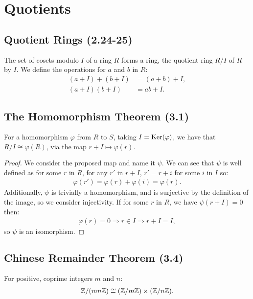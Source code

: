 \section{Quotients}

\subsection{Quotient Rings (2.24-25)} \label{2.24} \label{2.25}

The set of cosets modulo $I$ of a ring $R$ forms a ring, the quotient ring $R / I$ of 
$R$ by $I$. We define the operations for $a$ and $b$ in $R$: \begin{align*}
    (a + I) + (b + I) &= (a + b) + I, \\
    (a + I)(b + I) &= ab + I.
\end{align*}

\subsection{The Homomorphism Theorem (3.1)} \label{3.1}

For a homomorphism $\varphi$ from $R$ to $S$, taking $I = \operatorname{Ker}(\varphi)$, we have
that $R / I \cong \varphi(R)$, via the map $r + I \mapsto \varphi(r)$.

\begin{proof}
    We consider the proposed map and name it $\psi$.
    We can see that $\psi$ is well defined as for some $r$ in $R$, for any $r'$ in $r + I$, 
    $r' = r + i$ for some $i$ in $I$ so: \begin{align*}
        \varphi(r') = \varphi(r) + \varphi(i) = \varphi(r).
    \end{align*} Additionally, $\psi$ is trivially a homomorphism, and is surjective
    by the definition of the image, so we consider injectivity. 
    If for some $r$ in $R$, we have $\psi(r + I) = 0$ then: \begin{align*}
        \varphi(r) = 0 \Longrightarrow r \in I \Longrightarrow r + I = I,
    \end{align*} so $\psi$ is an isomorphism.
\end{proof}

\subsection{Chinese Remainder Theorem (3.4)} \label{3.4}

For positive, coprime integers $m$ and $n$: \begin{align*}
    \mathbb{Z} / (mn\mathbb{Z}) \cong (\mathbb{Z} / m\mathbb{Z}) \times (\mathbb{Z} / n\mathbb{Z}).
\end{align*}

